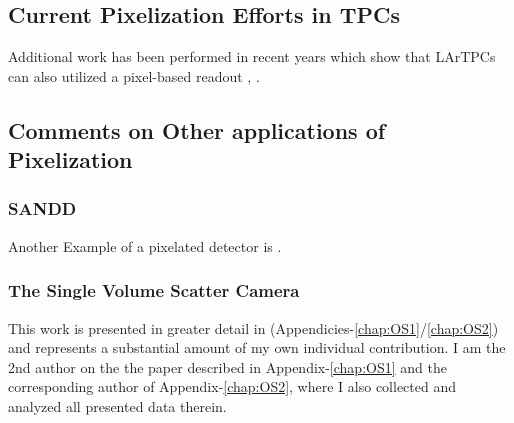 \subsection{Current Pixelization Efforts in TPCs}



Additional work has been performed in recent years which show that LArTPCs can also utilized a pixel-based readout \citep{larpix:Dwyer_2018}, \citep{Asaadi_2018}.

\subsection{Comments on Other applications of Pixelization}

\subsubsection{SANDD}

Another Example of a pixelated detector is \citep{SUTANTO2021_sandd_165409}.


\subsubsection{The Single Volume Scatter Camera}

This work is presented in greater detail in (Appendicies-\ref{chap:OS1}/\ref{chap:OS2}) and represents a substantial amount of my own individual contribution. 
I am the 2nd author on the the paper described in Appendix-\ref{chap:OS1} and the corresponding author of Appendix-\ref{chap:OS2}, where I also collected and analyzed all presented data therein.
